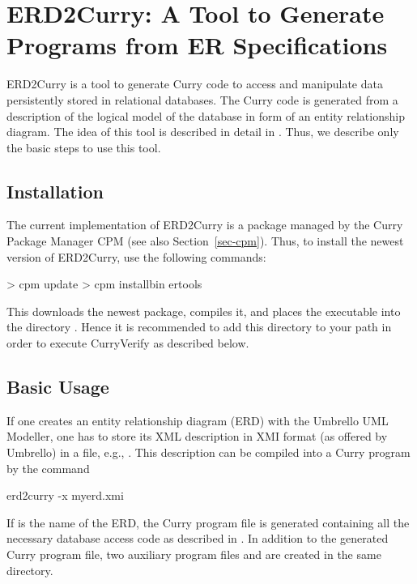 \section{ERD2Curry: A Tool to Generate Programs from ER Specifications}
\label{sec-erd2curry}

ERD2Curry
is a tool to generate Curry code to access and manipulate data
persistently stored in relational databases.
The Curry code is generated from a description of the logical model
of the database in form of an
entity relationship diagram.
The idea of this tool is described in detail in
\cite{BrasselHanusMueller08PADL}.
Thus, we describe only the basic steps to use this tool.

\subsection{Installation}

The current implementation of ERD2Curry is a package
managed by the Curry Package Manager CPM
(see also Section~\ref{sec-cpm}).
Thus, to install the newest version of ERD2Curry, use the following commands:
%
\begin{curry}
> cpm update
> cpm installbin ertools
\end{curry}
%
This downloads the newest package, compiles it, and places
the executable  into the directory .
Hence it is recommended to add this directory to your path
in order to execute CurryVerify as described below.

\subsection{Basic Usage}

If one creates an entity relationship diagram (ERD)
with the Umbrello UML Modeller, one has to store its
XML description in XMI format (as offered by Umbrello)
in a file, e.g., .
This description can be compiled into a Curry program by the
command
\begin{curry}
erd2curry -x myerd.xmi
\end{curry}
If  is the name of the ERD, the Curry program file
 is generated containing all the necessary
database access code as described in \cite{BrasselHanusMueller08PADL}.
In addition to the generated Curry program file,
two auxiliary program files
 and 
are created in the same directory.

